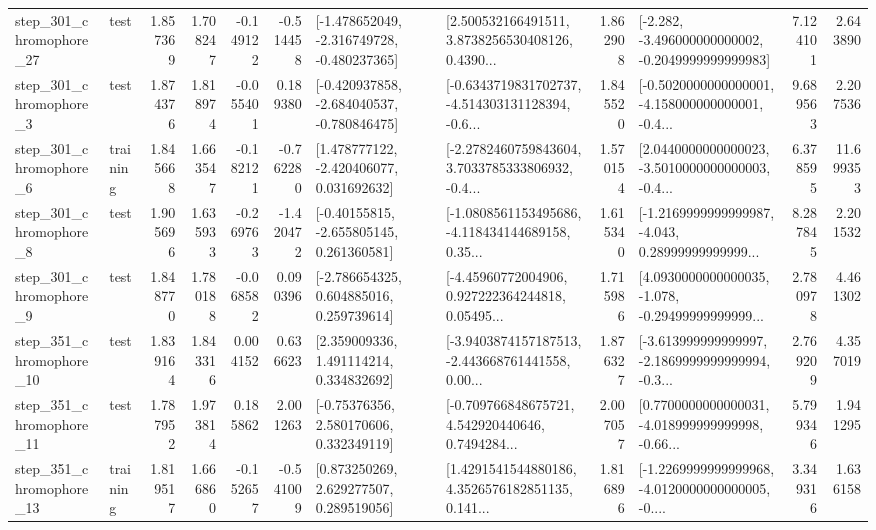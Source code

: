 \begin{tabular}{llrrrrllrlrr}
  step\_301\_chromophore\_27 &      test &      1.857369 &    1.708247 &     -0.149122 & -0.514458 &  [-1.478652049, -2.316749728, -0.480237365] &  [2.500532166491511, 3.8738256530408126, 0.4390... &       1.862908 &  [-2.282, -3.496000000000002, -0.2049999999999983] &            7.124101 &          2.643890 \\
   step\_301\_chromophore\_3 &      test &      1.874376 &    1.818974 &     -0.055401 &  0.189380 &  [-0.420937858, -2.684040537, -0.780846475] &  [-0.6343719831702737, -4.514303131128394, -0.6... &       1.845520 &  [-0.5020000000000001, -4.158000000000001, -0.4... &            9.689563 &          2.207536 \\
   step\_301\_chromophore\_6 &  training &      1.845668 &    1.663547 &     -0.182121 & -0.762280 &    [1.478777122, -2.420406077, 0.031692632] &  [-2.2782460759843604, 3.7033785333806932, -0.4... &       1.570154 &  [2.0440000000000023, -3.5010000000000003, -0.4... &            6.378595 &         11.699353 \\
   step\_301\_chromophore\_8 &      test &      1.905696 &    1.635933 &     -0.269763 & -1.420472 &    [-0.40155815, -2.655805145, 0.261360581] &  [-1.0808561153495686, -4.118434144689158, 0.35... &       1.615340 &  [-1.2169999999999987, -4.043, 0.28999999999999... &            8.287845 &          2.201532 \\
   step\_301\_chromophore\_9 &      test &      1.848770 &    1.780188 &     -0.068582 &  0.090396 &    [-2.786654325, 0.604885016, 0.259739614] &  [-4.45960772004906, 0.927222364244818, 0.05495... &       1.715986 &  [4.0930000000000035, -1.078, -0.29499999999999... &            2.780978 &          4.461302 \\
  step\_351\_chromophore\_10 &      test &      1.839164 &    1.843316 &      0.004152 &  0.636623 &     [2.359009336, 1.491114214, 0.334832692] &  [-3.9403874157187513, -2.443668761441558, 0.00... &       1.876327 &  [-3.613999999999997, -2.1869999999999994, -0.3... &            2.769209 &          4.357019 \\
  step\_351\_chromophore\_11 &      test &      1.787952 &    1.973814 &      0.185862 &  2.001263 &     [-0.75376356, 2.580170606, 0.332349119] &  [-0.709766848675721, 4.542920440646, 0.7494284... &       2.007057 &  [0.7700000000000031, -4.018999999999998, -0.66... &            5.799346 &          1.941295 \\
  step\_351\_chromophore\_13 &  training &      1.819517 &    1.666860 &     -0.152657 & -0.541009 &     [0.873250269, 2.629277507, 0.289519056] &  [1.4291541544880186, 4.3526576182851135, 0.141... &       1.816896 &  [-1.2269999999999968, -4.0120000000000005, -0.... &            3.349316 &          1.636158 \\

\end{tabular}
